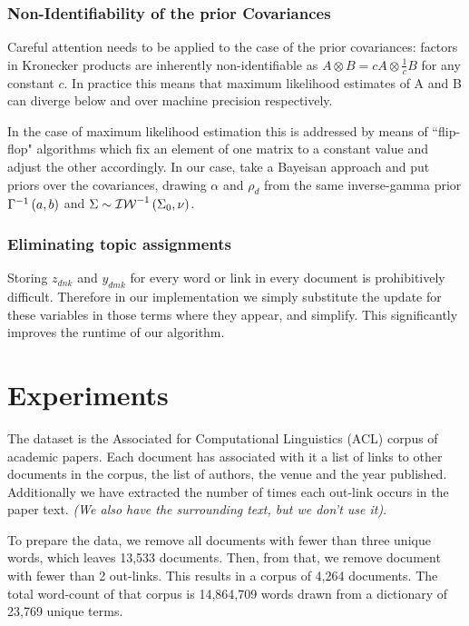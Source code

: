 \subsubsection*{Non-Identifiability of the prior Covariances}
Careful attention needs to be applied to the case of the prior covariances: factors in Kronecker products are inherently non-identifiable as $A \otimes B = c A \otimes \frac{1}{c} B$ for any constant $c$. In practice this means that maximum likelihood estimates of A and B can diverge below and over machine precision respectively.

In the case of maximum likelihood estimation this is addressed by means of ``flip-flop" algorithms\cite{Srivastava2009} which fix an element of one matrix to a constant value and adjust the other accordingly. In our case, take a Bayeisan approach and put priors over the covariances, drawing $\alpha$ and $\rho_d$ from the same inverse-gamma prior ${\Gamma}^{-1}\left(a, b\right)$ and $\Sigma \sim {\mathcal{IW}}^{-1}\left(\Sigma_0, \nu\right)$. 


\subsubsection*{Eliminating topic assignments}
Storing $z_{dnk}$ and $y_{dmk}$ for every word or link in every document is prohibitively difficult. Therefore in our implementation we simply substitute the update for these variables in those terms where they appear, and simplify. This significantly improves the runtime of our algorithm. 
\section{Experiments}
The dataset is the Associated for Computational Linguistics (ACL) corpus of academic papers. Each document has associated with it a list of links to other documents in the corpus, the list of authors, the venue and the year published. Additionally we have extracted the number of times each out-link occurs in the paper text. \emph{(We also have the surrounding text, but we don't use it)}.

To prepare the data, we remove all documents with fewer than three unique words, which leaves 13,533 documents. Then, from that, we remove document with fewer than 2 out-links. This results in a corpus of 4,264 documents. The total word-count of that corpus is 14,864,709 words drawn from a dictionary of 23,769 unique terms.


